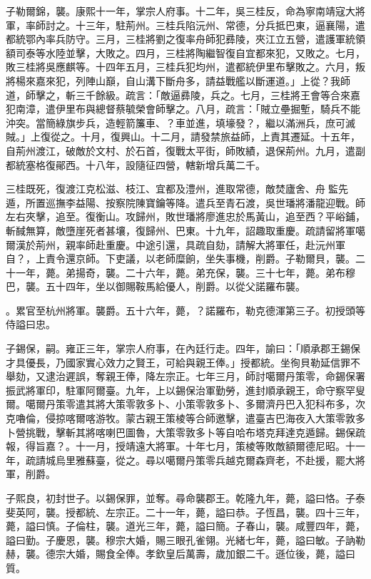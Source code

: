 \begin{pinyinscope}
子勒爾錦，襲。康熙十一年，掌宗人府事。十二年，吳三桂反，命為寧南靖寇大將軍，率師討之。十三年，駐荊州。三桂兵陷沅州、常德，分兵抵巴東，逼襄陽，遣都統鄂內率兵防守。三月，三桂將劉之復率舟師犯彞陵，夾江立五營，遣護軍統領額司泰等水陸並擊，大敗之。四月，三桂將陶繼智復自宜都來犯，又敗之。七月，敗三桂將吳應麒等。十四年五月，三桂兵犯均州，遣都統伊里布擊敗之。六月，叛將楊來嘉來犯，列陣山巔，自山溝下斷舟多，請益戰艦以斷運道。」上從？我師道，師擊之，斬三千餘級。疏言：「敵逼彞陵，兵之。七月，三桂將王會等合來嘉犯南漳，遣伊里布與總督蔡毓榮會師擊之。八月，疏言：「賊立壘掘塹，騎兵不能沖突。當簡綠旗步兵，造輕箭簾車、？車並進，填壕發？，繼以滿洲兵，庶可滅賊。」上復從之。十月，復興山。十二月，請發禁旅益師，上責其遷延。十五年，自荊州渡江，破敵於文村、於石首，復戰太平街，師敗績，退保荊州。九月，遣副都統塞格復鄖西。十八年，設隨征四營，轄新增兵萬二千。

三桂既死，復渡江克松滋、枝江、宜都及澧州，進取常德，敵焚廬舍、舟監先遁，所置巡撫李益陽、按察院陳寶鑰等降。遣兵至青石渡，吳世璠將潘龍迎戰。師左右夾擊，追至。復衡山。攻歸州，敗世璠將廖進忠於馬黃山，追至西？平峪鋪，斬馘無算，敵墮崖死者甚壤，復歸州、巴東。十九年，詔趣取重慶。疏請留將軍噶爾漢於荊州，親率師赴重慶。中途引還，具疏自劾，請解大將軍任，赴沅州軍自？，上責令還京師。下吏議，以老師糜餉，坐失事機，削爵。子勒爾貝，襲。二十一年，薨。弟揚奇，襲。二十六年，薨。弟充保，襲。三十七年，薨。弟布穆巴，襲。五十四年，坐以御賜鞍馬給優人，削爵。以從父諾羅布襲。

。累官至杭州將軍。襲爵。五十六年，薨，？諾羅布，勒克德渾第三子。初授頭等侍謚曰忠。

子錫保，嗣。雍正三年，掌宗人府事，在內廷行走。四年，諭曰：「順承郡王錫保才具優長，乃國家實心效力之賢王，可給與親王俸。」授都統。坐徇貝勒延信罪不舉劾，又逮治遲誤，奪親王俸，降左宗正。七年三月，師討噶爾丹策零，命錫保署振武將軍印，駐軍阿爾臺。九年，上以錫保治軍勤勞，進封順承親王，命守察罕叟爾。噶爾丹策零遣其將大策零敦多卜、小策零敦多卜、多爾濟丹巴入犯科布多，次克嚕倫，侵掠喀爾喀游牧。蒙古親王策棱等合師邀擊，遣臺吉巴海夜入大策零敦多卜營挑戰，擊斬其將喀喇巴圖魯，大策零敦多卜等自哈布塔克拜達克遁歸。錫保疏報，得旨嘉？。十一月，授靖遠大將軍。十年七月，策棱等敗敵額爾德尼昭。十一年，疏請城烏里雅蘇臺，從之。尋以噶爾丹策零兵越克爾森齊老，不赴援，罷大將軍，削爵。

子熙良，初封世子。以錫保罪，並奪。尋命襲郡王。乾隆九年，薨，謚曰恪。子泰斐英阿，襲。授都統、左宗正。二十一年，薨，謚曰恭。子恆昌，襲。四十三年，薨，謚曰慎。子倫柱，襲。道光三年，薨，謚曰簡。子春山，襲。咸豐四年，薨，謚曰勤。子慶恩，襲。穆宗大婚，賜三眼孔雀翎。光緒七年，薨，謚曰敏。子訥勒赫，襲。德宗大婚，賜食全俸。孝欽皇后萬壽，歲加銀二千。遜位後，薨，謚曰質。


\end{pinyinscope}
